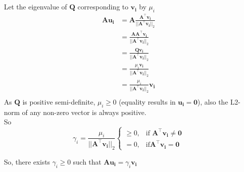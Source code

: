 \documentclass{article}
\begin{document}
\raggedright
\section{}
Let the eigenvalue of $\bm{Q}$ corresponding to $\bm{v_i}$ by $\mu_i$
\begin{align*}
    \bm{A}\bm{u_i} &= \bm{A}\frac{\bm{A}^\intercal \bm{v_i}}{\lvert\lvert\bm{A}^\intercal \bm{v_i} \rvert\rvert_2}\\
     &= \frac{\bm{A}\bm{A}^\intercal \bm{v_i}}{\lvert\lvert\bm{A}^\intercal \bm{v_i} \rvert\rvert_2}\\
     &= \frac{\bm{Q} \bm{v_i}}{\lvert\lvert\bm{A}^\intercal \bm{v_i} \rvert\rvert_2}\\
    &= \frac{\mu_i \bm{v_i}}{\lvert\lvert\bm{A}^\intercal \bm{v_i} \rvert\rvert_2}\\
     &= \frac{\mu_i}{\lvert\lvert\bm{A}^\intercal \bm{v_i} \rvert\rvert_2} \bm{v_i}\\
\end{align*}
As $\bm{Q}$ is positive semi-definite, $\mu_i \geq 0$ (equality results in $\bm{u_i} = \bm{0}$), also the L2-norm of any non-zero vector is always positive.\\
So \begin{equation*}
    \gamma_i = \frac{\mu_i}{\lvert\lvert\bm{A}^\intercal \bm{v_i} \rvert\rvert_2}
    \begin{cases}
    \geq 0, & \text{if }\bm{A}^\intercal \bm{v_i} \neq \bm{0}\\
    = 0, & \text{if} \bm{A}^\intercal \bm{v_i} = \bm{0}
  \end{cases}
\end{equation*}

So, there exists $\gamma_i \geq 0$ such that $\bm{Au_i} = \gamma_i \bm{v_i}$\\

\raggedright
\end{document}
